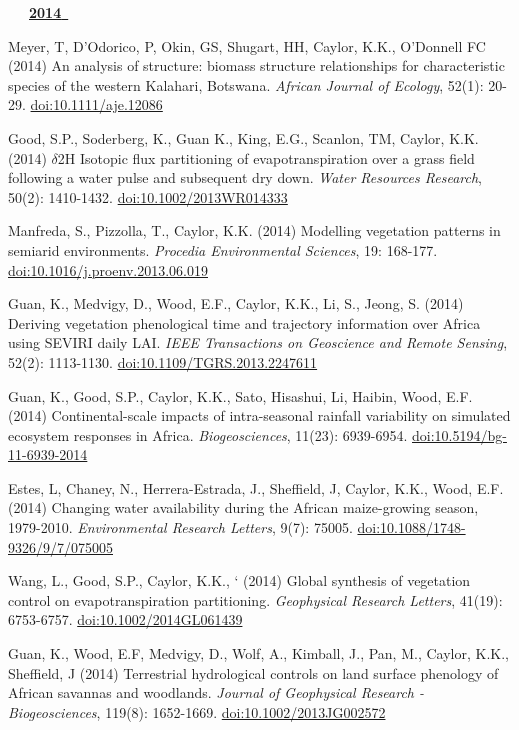 \begin{etaremune}
\mbox{\ \ \ \underline{\textbf{2014 }}}

\item Meyer, T, D'Odorico, P, Okin, GS, Shugart, HH, Caylor, K.K., O'Donnell FC (2014) An analysis of structure: biomass structure relationships for characteristic species of the western Kalahari, Botswana. \emph{African Journal of Ecology}, 52(1): 20-29. \href{https://doi.org/10.1111/aje.12086}{doi:10.1111/aje.12086}
\item Good, S.P., Soderberg, K., Guan K., King, E.G., Scanlon, TM, Caylor, K.K. (2014) $\delta$2H Isotopic flux partitioning of evapotranspiration over a grass field following a water pulse and subsequent dry down. \emph{Water Resources Research}, 50(2): 1410-1432. \href{https://doi.org/10.1002/2013WR014333}{doi:10.1002/2013WR014333}
\item Manfreda, S., Pizzolla, T., Caylor, K.K. (2014) Modelling vegetation patterns in semiarid environments. \emph{Procedia Environmental Sciences}, 19: 168-177. \href{https://doi.org/10.1016/j.proenv.2013.06.019}{doi:10.1016/j.proenv.2013.06.019}
\item Guan, K., Medvigy, D., Wood, E.F., Caylor, K.K., Li, S., Jeong, S. (2014) Deriving vegetation phenological time and trajectory information over Africa using SEVIRI daily LAI. \emph{IEEE Transactions on Geoscience and Remote Sensing}, 52(2): 1113-1130. \href{https://doi.org/10.1109/TGRS.2013.2247611}{doi:10.1109/TGRS.2013.2247611}
\item Guan, K., Good, S.P., Caylor, K.K., Sato, Hisashui, Li, Haibin, Wood, E.F. (2014) Continental-scale impacts of intra-seasonal rainfall variability on simulated ecosystem responses in Africa. \emph{Biogeosciences}, 11(23): 6939-6954. \href{https://doi.org/10.5194/bg-11-6939-2014}{doi:10.5194/bg-11-6939-2014}
\item Estes, L, Chaney, N., Herrera-Estrada, J., Sheffield, J, Caylor, K.K., Wood, E.F. (2014) Changing water availability during the African maize-growing season, 1979-2010. \emph{Environmental Research Letters}, 9(7): 75005. \href{https://doi.org/10.1088/1748-9326/9/7/075005}{doi:10.1088/1748-9326/9/7/075005}
\item Wang, L., Good, S.P., Caylor, K.K., ` (2014) Global synthesis of vegetation control on evapotranspiration partitioning. \emph{Geophysical Research Letters}, 41(19): 6753-6757. \href{https://doi.org/10.1002/2014GL061439}{doi:10.1002/2014GL061439}
\item Guan, K., Wood, E.F, Medvigy, D., Wolf, A., Kimball, J., Pan, M., Caylor, K.K., Sheffield, J (2014) Terrestrial hydrological controls on land surface phenology of African savannas and woodlands. \emph{Journal of Geophysical Research - Biogeosciences}, 119(8): 1652-1669. \href{https://doi.org/10.1002/2013JG002572}{doi:10.1002/2013JG002572}


\end{etaremune}
